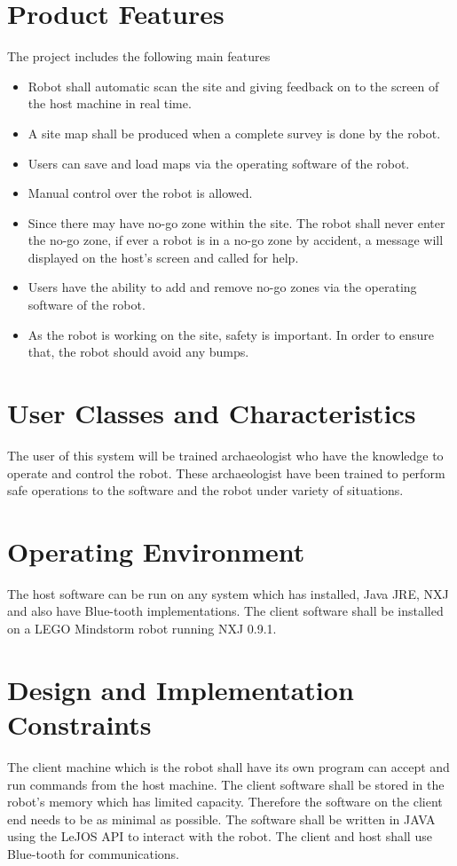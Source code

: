 \documentclass[11pt, a4paper]{report}
\begin{document}
\section{Product Features}
The project includes the following main features
\begin{itemize}
\item Robot shall automatic scan the site and giving feedback on to the screen of the host machine in real time. 
\item A site map shall be produced when a complete survey is done by the robot.
\item Users can save and load maps via the operating software of the robot. 
\item Manual control over the robot is allowed. 
\item Since there may have no-go zone within the site. The robot shall never enter the no-go zone, if ever a robot is in a no-go zone by accident, a message will displayed on the host's screen and called for help.
\item Users have the ability to add and remove no-go zones via the operating software of the robot.
\item As the robot is working on the site, safety is important. In order to ensure that, the robot should avoid any bumps.
\end{itemize}

\section{User Classes and Characteristics}
The user of this system will be trained archaeologist who have the knowledge to operate and control the robot. These archaeologist have been trained to perform safe operations to the software and the robot under variety of situations.

\section{Operating Environment}
The host software can be run on any system which has installed, Java JRE, NXJ and also have Blue-tooth implementations.
The client software shall be installed on a LEGO\textregistered{} Mindstorm\textregistered{} robot running NXJ 0.9.1.

\section{Design and Implementation Constraints}
The client machine which is the robot shall have its own program can accept and run commands from the host machine. The client software shall be stored in the robot's memory which has limited capacity. Therefore the software on the client end needs to be as minimal as possible.
The software shall be written in JAVA using the LeJOS API to interact with the robot.
The client and host shall use Blue-tooth\textregistered{}  for communications.
\end{document}
